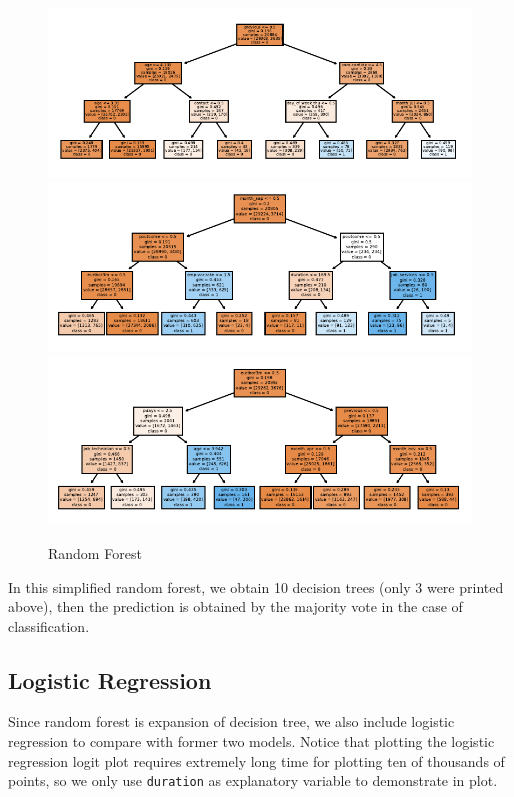 \documentclass[11pt,a4paper]{article}
\begin{document}
    \begin{figure}[!ht]
        \centering
        \includegraphics[width = \textwidth]{plot/classification/random_forest0.pdf}
        \includegraphics[width = \textwidth]{plot/classification/random_forest1.pdf}
        \includegraphics[width = \textwidth]{plot/classification/random_forest2.pdf}
        \caption{Random Forest}
        \label{fig:random_forest}
    \end{figure}
    
    \newpage
    \noindent
    In this simplified random forest, we obtain 10 decision trees (only 3 were printed above), then the prediction is obtained by the majority vote in the case of classification.
    
    
    \subsection{Logistic Regression} \label{logistic_regression}
    Since random forest is expansion of decision tree, we also include logistic regression to compare with former two models. Notice that plotting the logistic regression logit plot requires extremely long time for plotting ten of thousands of points, so we only use \texttt{duration} as explanatory variable to demonstrate in plot.
    
\end{document}
